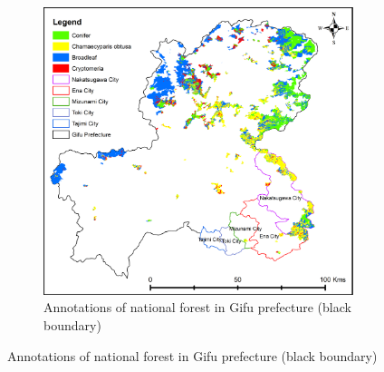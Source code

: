 \begin{figure}[p]
    \centering
    \begin{subfigure}{\textwidth}
        \centering
        \includegraphics[width=\textwidth]{figs/chap5/gifu.png}
        \caption{Annotations of national forest in Gifu prefecture (black boundary)}
        \label{fig:chap5_gifu}
    \end{subfigure}


\end{figure}
